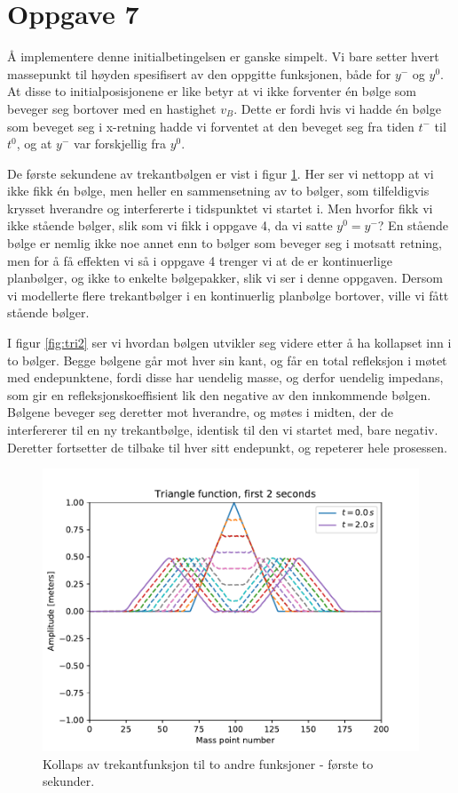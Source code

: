 \documentclass[12p,a4paper]{report}
\begin{document}
\section*{Oppgave 7}
Å implementere denne initialbetingelsen er ganske simpelt. Vi bare setter hvert massepunkt til høyden spesifisert av den oppgitte funksjonen, både for $y^-$ og $y^0$. At disse to initialposisjonene er like betyr at vi ikke forventer én bølge som beveger seg bortover med en hastighet $v_B$. Dette er fordi hvis vi hadde én bølge som beveget seg i x-retning hadde vi forventet at den beveget seg fra tiden $t^-$ til $t^0$, og at $y^-$ var forskjellig fra $y^0$.

De første sekundene av trekantbølgen er vist i figur \ref{fig:tri}. Her ser vi nettopp at vi ikke fikk én bølge, men heller en sammensetning av to bølger, som tilfeldigvis krysset hverandre og interfererte i tidspunktet vi startet i. Men hvorfor fikk vi ikke stående bølger, slik som vi fikk i oppgave 4, da vi satte $y^0 = y^-$? En stående bølge er nemlig ikke noe annet enn to bølger som beveger seg i motsatt retning, men for å få effekten vi så i oppgave 4 trenger vi at de er kontinuerlige planbølger, og ikke to enkelte bølgepakker, slik vi ser i denne oppgaven. Dersom vi modellerte flere trekantbølger i en kontinuerlig planbølge bortover, ville vi fått stående bølger.
 
I figur \ref{fig:tri2} ser vi hvordan bølgen utvikler seg videre etter å ha kollapset inn i to bølger. Begge bølgene går mot hver sin kant, og får en total refleksjon i møtet med endepunktene, fordi disse har uendelig masse, og derfor uendelig impedans, som gir en refleksjonskoeffisient lik den negative av den innkommende bølgen. Bølgene beveger seg deretter mot hverandre, og møtes i midten, der de interfererer til en ny trekantbølge, identisk til den vi startet med, bare negativ. Deretter fortsetter de tilbake til hver sitt endepunkt, og repeterer hele prosessen.

\begin{figure}[H]
\centering
\includegraphics[width=\textwidth]{../fig/triangle_collapse.pdf}
\caption{Kollaps av trekantfunksjon til to andre funksjoner - første to sekunder.}
\label{fig:tri}
\end{figure}
\end{document}
